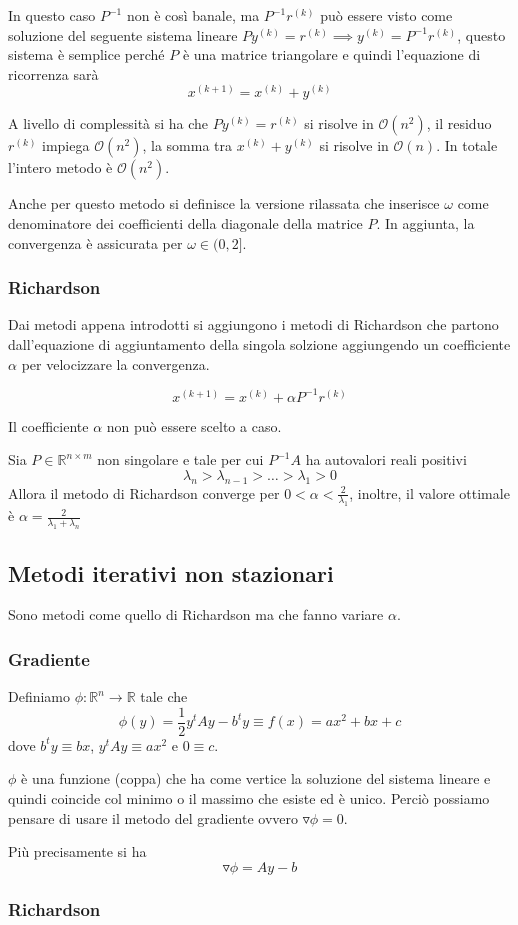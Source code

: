 In questo caso $P^{-1}$ non è così banale, ma $P^{-1}r^{(k)}$ può essere visto come 
soluzione del seguente sistema lineare $Py^{(k)}=r^{(k)}\implies y^{(k)} = P^{-1}r^{(k)}$, questo 
sistema è semplice perché $P$ è una matrice triangolare e quindi l'equazione di ricorrenza 
sarà
$$x^{(k+1)} = x^{(k)}+y^{(k)}$$

A livello di complessità si ha che $Py^{(k)}=r^{(k)}$ si risolve in $\mathcal{O}(n^2)$,
il residuo $r^{(k)}$ impiega $\mathcal{O}(n^2)$, la somma tra $x^{(k)}+y^{(k)}$ si 
risolve in $ \mathcal{O}(n)$. In totale l'intero metodo è $\mathcal{O}(n^2)$.

Anche per questo metodo si definisce la versione rilassata che inserisce $\omega$ 
come denominatore dei coefficienti della diagonale della matrice $P$. In aggiunta,
la convergenza è assicurata per $\omega \in (0,2]$.

\subsubsection{Richardson}

Dai metodi appena introdotti si aggiungono i metodi di Richardson che partono dall'equazione 
di aggiuntamento della singola solzione aggiungendo un coefficiente $\alpha$ per 
velocizzare la convergenza.

$$x^{(k+1)} = x^{(k)}+\alpha P^{-1}r^{(k)}$$

Il coefficiente $\alpha$ non può essere scelto a caso.

\begin{teorema}
    Sia $P\in \mathbb{R}^{n\times m}$ non singolare e tale per cui $P^{-1}A$ ha 
    autovalori reali positivi
    $$\lambda_n >\lambda_{n-1} > \dots > \lambda_1 > 0$$
    Allora il metodo di Richardson converge per $0<\alpha < \frac{2}{\lambda_1}$,
    inoltre, il valore ottimale è $\alpha = \frac{2}{\lambda_1+\lambda_n}$
\end{teorema}
\subsection{Metodi iterativi non stazionari}
Sono metodi come quello di Richardson ma che fanno variare $\alpha$.

\subsubsection{Gradiente}
Definiamo $\phi: \mathbb{R}^n \rightarrow \mathbb{R}$ tale che 
$$\phi(y)=\frac{1}{2}y^tAy-b^ty \equiv f(x) = ax^2+bx+c$$
dove $b^ty \equiv bx$, $y^tAy \equiv ax^2$ e $0\equiv c$.

$\phi$ è una funzione (coppa) che ha come vertice la soluzione del sistema lineare 
e quindi coincide col minimo o il massimo che esiste ed è unico. Perciò possiamo 
pensare di usare il metodo del gradiente ovvero $\triangledown \phi =0$.

Più precisamente si ha 
$$\triangledown \phi = Ay-b $$
\subsubsection{Richardson}
